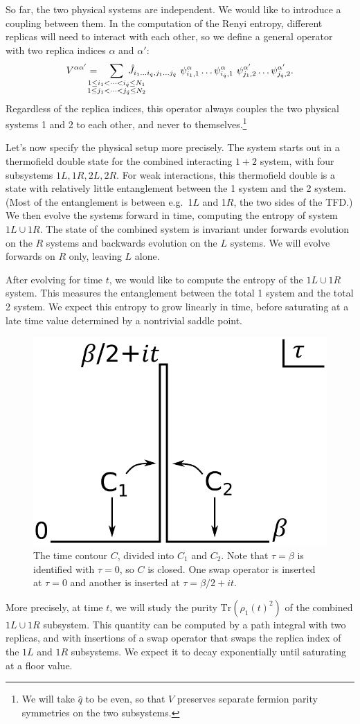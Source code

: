 \documentclass[12pt]{article}
\newcommand{\be}{\begin{equation}}
\newcommand{\ee}{\end{equation}}
\numberwithin{equation}{section}
\def\tr{\text{Tr}}
\begin{document}
So far, the two physical systems are independent. We would like to introduce a coupling between them. In the computation of the Renyi entropy, different replicas will need to interact with each other, so we define a general operator with two replica indices $\alpha$ and $\alpha'$:
\be
V^{\alpha\alpha'} = \hspace{7pt}\hspace{-20pt}\sum_{\substack{1\le i_1<\dots<i_{\hat{q}}\le N_1 \\ 1\le j_1<\dots<j_{\hat{q}}\le N_2}}\hspace{-20pt}\hat{J}_{i_1\dots i_{\hat{q}},j_1\dots j_{\hat{q}}} \ \psi_{i_1,1}^\alpha\dots \psi_{i_{\hat{q}},1}^\alpha \ \psi_{j_1,2}^{\alpha'}\dots \psi_{j_{\hat{q}},2}^{\alpha'}.
\ee
Regardless of the replica indices, this operator always couples the two physical systems 1 and 2 to each other, and never to themselves.\footnote{We will take $\hat{q}$ to be even, so that $V$ preserves separate fermion parity symmetries on the two subsystems.}

Let's now specify the physical setup more precisely. The system starts out in a thermofield double state for the combined interacting $1+2$ system, with four subsystems $1L,1R,2L,2R$. For weak interactions, this thermofield double is a state with relatively little entanglement between the 1 system and the 2 system. (Most of the entanglement is between e.g.~1$L$ and 1$R$, the two sides of the TFD.) We then evolve the systems forward in time, computing the entropy of system $1L\cup 1R$. The state of the combined system is invariant under forwards evolution on the $R$ systems and backwards evolution on the $L$ systems. We will evolve forwards on $R$ only, leaving $L$ alone.

After evolving for time $t$, we would like to compute the entropy of the $1L\cup 1R$ system. This measures the entanglement between the total 1 system and the total 2 system. We expect this entropy to grow linearly in time, before saturating at a late time value determined by a nontrivial saddle point.
\begin{figure}[t]
\begin{center}
\includegraphics[width = .27\textwidth]{images/12.pdf}
\caption{{\small The time contour $C$, divided into $C_1$ and $C_2$. Note that $\tau = \beta$ is identified with $\tau = 0$, so $C$ is closed. One swap operator is inserted at $\tau = 0$ and another is inserted at $\tau = \beta/2+it$.}}\label{timeContour}
\end{center}
\end{figure}
More precisely, at time $t$, we will study the purity $\tr\left(\rho_1(t)^2\right)$ of the combined $1L \cup 1R$ subsystem. This quantity can be computed by a path integral with two replicas, and with insertions of a swap operator that swaps the replica index of the $1L$ and $1R$ subsystems. We expect it to decay exponentially until saturating at a floor value.
\end{document}
